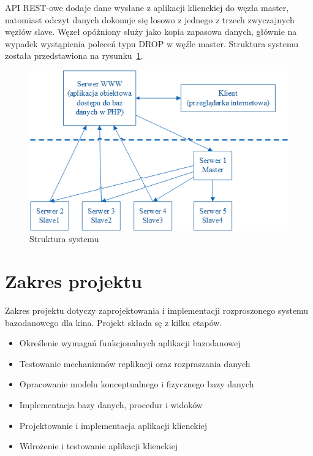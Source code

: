 API REST-owe dodaje dane wysłane z aplikacji klienckiej do węzła master, natomiast odczyt danych dokonuje się losowo z jednego z trzech zwyczajnych węzłów slave. Węzeł opóźniony służy jako kopia zapasowa danych, głównie na wypadek wystąpienia poleceń typu DROP w węźle master. Struktura systemu została przedstawiona na rysunku~\ref{fig:diagram}.

\begin{figure} [H]
	\centering
	\includegraphics[width=0.6\linewidth]{rozdzial01/diagram.png}
	\caption{Struktura systemu}
	\label{fig:diagram}
\end{figure}

\section{Zakres projektu}
Zakres projektu dotyczy zaprojektowania i implementacji rozproszonego systemu bazodanowego dla kina. Projekt składa sę z kilku etapów.

\begin{itemize}
	\item Określenie wymagań funkcjonalnych aplikacji bazodanowej
	\item Testowanie mechanizmów replikacji oraz rozpraszania danych
	\item Opracowanie modelu konceptualnego i fizycznego bazy danych
	\item Implementacja bazy danych, procedur i widoków
	\item Projektowanie i implementacja aplikacji klienckiej
	\item Wdrożenie i testowanie aplikacji klienckiej
\end{itemize}

